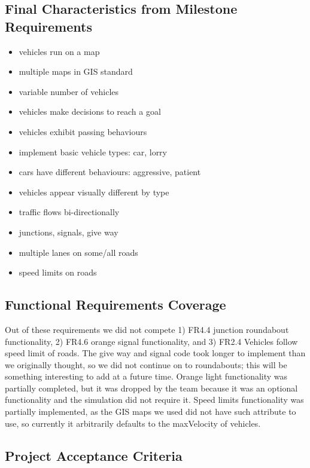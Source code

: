 \documentclass[11pt]{article}
\begin{document}
\begin{enumerate}
\subsection{Final Characteristics from Milestone Requirements}
\begin{itemize}
\item vehicles run on a map
\item multiple maps in GIS standard
\item variable number of vehicles
\item vehicles make decisions to reach a goal
\item vehicles exhibit passing behaviours 
\item implement basic vehicle types: car, lorry
\item cars have different behaviours: aggressive, patient
\item vehicles appear visually different by type
\item traffic flows bi-directionally
\item junctions, signals, give way 
\item multiple lanes on some/all roads
\item speed limits on roads
\end{itemize}



\subsection{Functional Requirements Coverage}

Out of these requirements we did not compete 1) FR4.4 junction roundabout functionality, 2) FR4.6 orange signal functionality, and 3) FR2.4 Vehicles follow speed limit of roads. The give way and signal code took longer to implement than we originally thought, so we did not continue on to roundabouts; this will be something interesting to add at a future time. Orange light functionality was partially completed, but it was dropped by the team because it was an optional functionality and the simulation did not require it. Speed limits functionality was partially implemented, as the GIS maps we used did not have such attribute to use, so currently it arbitrarily defaults to the maxVelocity of vehicles.

\subsection{Project Acceptance Criteria}


\end{enumerate}
\end{document}
